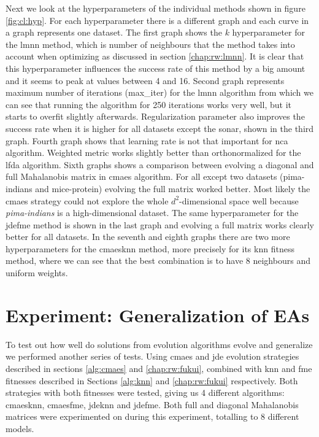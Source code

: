 \documentclass[12pt,a4paper]{report}
\begin{document}
Next we look at the hyperparameters of the individual methods shown in figure \ref{fig:cl:hyp}. For each hyperparameter there is a different graph and each curve in a graph represents one dataset. The first graph shows the $k$ hyperparameter for the \ac{lmnn} method, which is number of neighbours that the method takes into account when optimizing as discussed in section \ref{chap:rw:lmnn}. It is clear that this hyperparameter influences the success rate of this method by a big amount and it seems to peak at values between 4 and 16. Second graph represents maximum number of iterations (max\_iter) for the \ac{lmnn} algorithm from which we can see that running the algorithm for 250 iterations works very well, but it starts to overfit slightly afterwards. Regularization parameter also improves the success rate when it is higher for all datasets except the sonar, shown in the third graph. Fourth graph shows that learning rate is not that important for \ac{nca} algorithm. Weighted metric works slightly better than orthonormalized for the \ac{lfda} algorithm. Sixth graphs shows a comparison between evolving a diagonal and full Mahalanobis matrix in \ac{cmaes} algorithm. For all except two datasets (pima-indians and mice-protein) evolving the full matrix worked better. Most likely the \ac{cmaes} strategy could not explore the whole $d^2$-dimensional space well because \textit{pima-indians} is a high-dimensional dataset. The same hyperparameter for the \ac{jdefme} method is shown in the last graph and evolving a full matrix works clearly better for all datasets. In the seventh and eighth graphs there are two more hyperparameters for the \ac{cmaesknn} method, more precisely for its \ac{knn} fitness method, where we can see that the best combination is to have 8 neighbours and uniform weights.


\section{Experiment: Generalization of EAs} \label{chap:exp:fitness}

To test out how well do solutions from evolution algorithms evolve and generalize we performed another series of tests. Using \ac{cmaes} and \ac{jde} evolution strategies described in sections \ref{alg:cmaes} and \ref{chap:rw:fukui}, combined with \ac{knn} and \ac{fme} fitnesses described in Sections \ref{alg:knn} and \ref{chap:rw:fukui} respectively. Both strategies with both fitnesses were tested, giving us 4 different algorithms: \ac{cmaesknn}, \ac{cmaesfme}, \ac{jdeknn} and \ac{jdefme}. Both full and diagonal Mahalanobis matrices were experimented on during this experiment, totalling to 8 different models.
\end{document}
